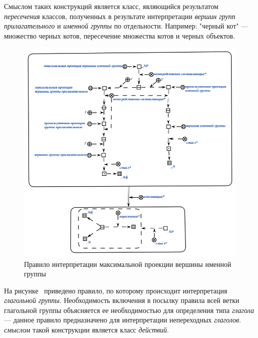 Смыслом таких конструкций является класс, являющийся результатом \textit{пересечения} классов, полученных в результате интерпретации \textit{вершин} \textit{групп прилагательного} и \textit{именной группы} по отдельности.
Например: "черный кот"{} --- множество черных котов, пересечение множества котов и черных объектов. %

\begin{figure}[h]
    \centering
    \includegraphics[scale=0.8]{images/part2/chapter_lang/d_sem_2}
    \caption{Правило интерпретации максимальной проекции вершины именной группы}
    \label{fig:d_sem_2}
\end{figure}

На рисунке~\textit{} приведено правило, по которому происходит интерпретация \textit{глагольной группы}.
Необходимость включения в посылку правила всей ветки глагольной группы объясняется ее необходимостью для определения типа \textit{глагола} --- данное правило предназначено для интерпретации непереходных \textit{глаголов}.
\textit{смыслом} такой конструкции является класс \textit{действий}.

